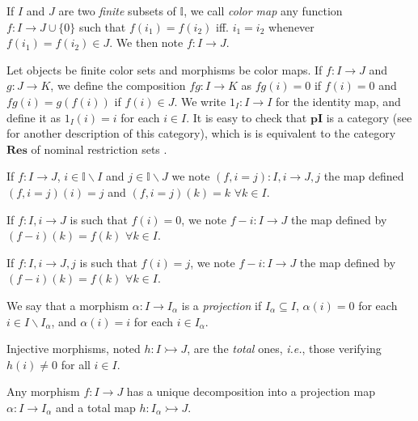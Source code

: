 \documentclass[english]{PaperTools/latex/lipics}
\def\pI{\ensuremath{\mathbf{pI}}}
\def\ie{\textit{i.e.}}
\begin{document}
\begin{definition}
  If $I$ and $J$ are two \emph{finite} subsets of $𝕀$, we call
  \emph{color map} any function $f : I → J ∪ \{0\}$ such that
  $f(i_1) = f(i_2)$ iff. $i_1 = i_2$ whenever $f(i_1) = f(i_2) ∈ J$.
  We then note $f : I → J$.
\end{definition}

\begin{definition}[Category $\pI{}$]
  \label{def:pI}
  Let objects be finite color sets and morphisms be color maps.
  If $f : I → J$ and $g : J → K$, we define the composition $fg : I → K$
  as $fg(i) = 0$ if $f(i) = 0$ and $fg(i) = g(f(i))$ if $f(i) ∈ J$.
  We write $1_I : I → I$ for the identity map, and define it as $1_I(i) = i$ for each $i ∈ I$.
  It is easy to check that \pI{} is a category (see \cite[ex.~9.7
  p.~176]{PittsAM:nomsns} for another description of this category),
  which is is equivalent to the category $\mathbf{Res}$ of nominal
  restriction sets \cite[rem.~9.9 p.~161]{PittsAM:nomsns}.
\end{definition}

If $f : I → J$, $i ∈ 𝕀 \backslash I$ and $j ∈ 𝕀 \backslash J$ we note
$(f, i = j) : I,i → J,j$ the map defined $(f,i=j)(i) = j$ and
$(f,i=j)(k) = k$ $∀ k ∈ I$.

If $f : I,i → J$ is such that $f(i) = 0$, we note $f-i : I → J$ the map
defined by $(f-i)(k) = f(k)$ $∀ k ∈ I$.

If $f : I,i → J,j$ is such that $f(i) = j$, we note $f-i : I → J$ the map
defined by $(f-i)(k) = f(k)$ $∀ k ∈ I$.

\begin{definition}[Projection]
   We say that a morphism $α : I → I_α$ is a \emph{projection} if
   $I_α ⊆ I$,
   $α(i) = 0$ for each $i ∈ I \backslash I_α$, and
   $α(i) = i$ for each $i ∈ I_α$.
\end{definition}
\begin{definition}
  Injective morphisms, noted $h : I ↣ J$, are the \emph{total} ones, \ie,
  those verifying $h(i) ≠ 0$ for all $i ∈ I$.
\end{definition}
\begin{remark}
  Any morphism $f : I → J$ has a
  unique decomposition into a projection map
  $α : I → I_α$ and a total map $h : I_α ↣ J$.
\end{remark}
\end{document}
